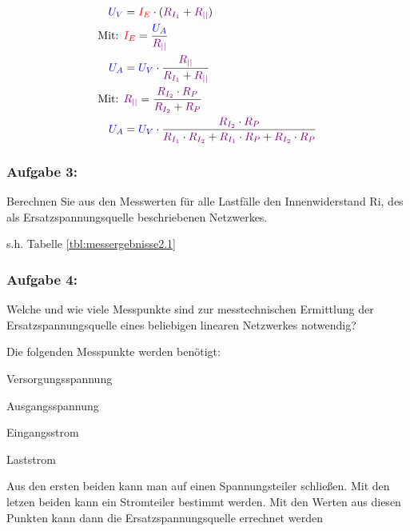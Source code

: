 \documentclass[a4paper,titlepage,parskip]{scrreprt}
\newcommand{\spannung}[1]{\textcolor{blue}{#1}}
\newcommand{\strom}[1]{\textcolor{red}{#1}}
\newcommand{\widerstand}[1]{\textcolor{violet}{#1}}
\begin{document}
            \begin{align*}
                \spannung{U_V} &= \strom{I_E} \cdot (\widerstand{R_{I_1}} + \widerstand{R_{||}})\\
                \text{Mit: }&  \strom{I_E} = \frac{\spannung{U_A}}{\widerstand{R_{||}}}\\
                \spannung{U_A} &= \spannung{U_V} \cdot \frac{\widerstand{R_{||}}}{\widerstand{R_{I_1}} + \widerstand{R_{||}}}\\
                \text{Mit: }& \widerstand{R_{||}} = \frac{\widerstand{R_{I_2}} \cdot \widerstand{R_P}}{\widerstand{R_{I_2}} + \widerstand{R_P}}\\
                \spannung{U_A} &= \spannung{U_V} \cdot \frac{\widerstand{R_{I_2}} \cdot \widerstand{R_P}}{\widerstand{R_{I_1}} \cdot \widerstand{R_{I_2}} + \widerstand{R_{I_1}} \cdot \widerstand{R_P} + \widerstand{R_{I_2}} \cdot \widerstand{R_P}}
            \end{align*}

           \subsubsection{Aufgabe 3:} Berechnen Sie aus den Messwerten für alle Lastfälle den Innenwiderstand Ri, des als Ersatzspannungsquelle beschriebenen Netzwerkes.
           
           s.h. Tabelle \ref{tbl:messergebnisse2.1}
           
           \subsubsection{Aufgabe 4:} Welche und wie viele Messpunkte sind zur messtechnischen Ermittlung der Ersatzspannungsquelle eines beliebigen linearen Netzwerkes notwendig?
           
           Die folgenden Messpunkte werden benötigt:
           \begin{itemize*}
               \item Versorgungsspannung
               \item Ausgangsspannung
               \item Eingangsstrom
               \item Laststrom
            \end{itemize*}
            Aus den ersten beiden kann man auf einen Spannungsteiler schließen. Mit den letzen beiden kann ein Stromteiler bestimmt werden. Mit den Werten aus diesen Punkten kann dann die Ersatzspannungsquelle errechnet werden
\end{document}

